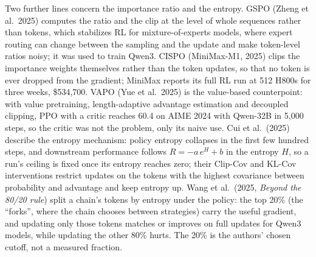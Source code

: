 \documentclass[11pt,letterpaper]{article}
\newcommand{\paper}[1]{\textit{#1}}
\begin{document}
Two further lines concern the importance ratio and the entropy. GSPO (Zheng et al.\ 2025) computes the ratio and the clip at the level of whole sequences rather than tokens, which stabilizes RL for mixture-of-experts models, where expert routing can change between the sampling and the update and make token-level ratios noisy; it was used to train Qwen3. CISPO (MiniMax-M1, 2025) clips the importance weights themselves rather than the token updates, so that no token is ever dropped from the gradient; MiniMax reports its full RL run at 512 H800s for three weeks, \$534,700. VAPO (Yue et al.\ 2025) is the value-based counterpoint: with value pretraining, length-adaptive advantage estimation and decoupled clipping, PPO with a critic reaches 60.4 on AIME 2024 with Qwen-32B in 5,000 steps, so the critic was not the problem, only its naive use. Cui et al.\ (2025) describe the entropy mechanism: policy entropy collapses in the first few hundred steps, and downstream performance follows $R=-a\,e^{H}+b$ in the entropy $H$, so a run's ceiling is fixed once its entropy reaches zero; their Clip-Cov and KL-Cov interventions restrict updates on the tokens with the highest covariance between probability and advantage and keep entropy up. Wang et al.\ (2025, \paper{Beyond the 80/20 rule}) split a chain's tokens by entropy under the policy: the top 20\% (the ``forks'', where the chain chooses between strategies) carry the useful gradient, and updating only those tokens matches or improves on full updates for Qwen3 models, while updating the other 80\% hurts. The 20\% is the authors' chosen cutoff, not a measured fraction.
\end{document}
